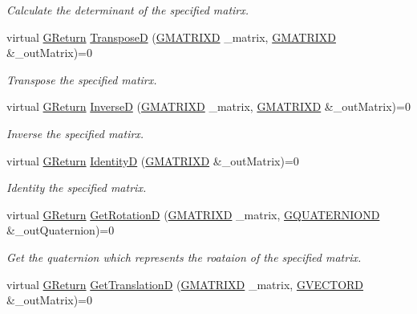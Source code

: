 \begin{DoxyCompactItemize}
\begin{DoxyCompactList}\small\item\em Calculate the determinant of the specified matirx. \end{DoxyCompactList}\item 
virtual \hyperlink{namespaceGW_a67a839e3df7ea8a5c5686613a7a3de21}{G\+Return} \hyperlink{classGW_1_1MATH_1_1GMatrix_add9f6f4f4689e683143990b434248404}{TransposeD} (\hyperlink{structGW_1_1MATH_1_1GMATRIXD}{G\+M\+A\+T\+R\+I\+XD} \+\_\+matrix, \hyperlink{structGW_1_1MATH_1_1GMATRIXD}{G\+M\+A\+T\+R\+I\+XD} \&\+\_\+out\+Matrix)=0
\begin{DoxyCompactList}\small\item\em Transpose the specified matirx. \end{DoxyCompactList}\item 
virtual \hyperlink{namespaceGW_a67a839e3df7ea8a5c5686613a7a3de21}{G\+Return} \hyperlink{classGW_1_1MATH_1_1GMatrix_ade39ff1c70cb06889196893aad819244}{InverseD} (\hyperlink{structGW_1_1MATH_1_1GMATRIXD}{G\+M\+A\+T\+R\+I\+XD} \+\_\+matrix, \hyperlink{structGW_1_1MATH_1_1GMATRIXD}{G\+M\+A\+T\+R\+I\+XD} \&\+\_\+out\+Matrix)=0
\begin{DoxyCompactList}\small\item\em Inverse the specified matirx. \end{DoxyCompactList}\item 
virtual \hyperlink{namespaceGW_a67a839e3df7ea8a5c5686613a7a3de21}{G\+Return} \hyperlink{classGW_1_1MATH_1_1GMatrix_a3b7136d0cbc99d1a29d159838b5e1d91}{IdentityD} (\hyperlink{structGW_1_1MATH_1_1GMATRIXD}{G\+M\+A\+T\+R\+I\+XD} \&\+\_\+out\+Matrix)=0
\begin{DoxyCompactList}\small\item\em Identity the specified matrix. \end{DoxyCompactList}\item 
virtual \hyperlink{namespaceGW_a67a839e3df7ea8a5c5686613a7a3de21}{G\+Return} \hyperlink{classGW_1_1MATH_1_1GMatrix_aa8a09092d814d7599f2ddedb6a34d1ea}{Get\+RotationD} (\hyperlink{structGW_1_1MATH_1_1GMATRIXD}{G\+M\+A\+T\+R\+I\+XD} \+\_\+matrix, \hyperlink{structGW_1_1MATH_1_1GQUATERNIOND}{G\+Q\+U\+A\+T\+E\+R\+N\+I\+O\+ND} \&\+\_\+out\+Quaternion)=0
\begin{DoxyCompactList}\small\item\em Get the quaternion which represents the roataion of the specified matrix. \end{DoxyCompactList}\item 
virtual \hyperlink{namespaceGW_a67a839e3df7ea8a5c5686613a7a3de21}{G\+Return} \hyperlink{classGW_1_1MATH_1_1GMatrix_a2b2dd5bfce9dc5f567a793ab2a21bb07}{Get\+TranslationD} (\hyperlink{structGW_1_1MATH_1_1GMATRIXD}{G\+M\+A\+T\+R\+I\+XD} \+\_\+matrix, \hyperlink{structGW_1_1MATH_1_1GVECTORD}{G\+V\+E\+C\+T\+O\+RD} \&\+\_\+out\+Matrix)=0

\end{DoxyCompactItemize}
